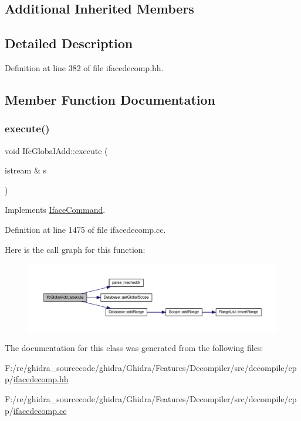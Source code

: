 \subsection*{Additional Inherited Members}


\subsection{Detailed Description}


Definition at line 382 of file ifacedecomp.\+hh.



\subsection{Member Function Documentation}
\mbox{\label{class_ifc_global_add_a727b49481db6ac9ae722fbce15ab595c}} 
\subsubsection{\texorpdfstring{execute()}{execute()}}
{\footnotesize\ttfamily void Ifc\+Global\+Add\+::execute (\begin{DoxyParamCaption}\item[{istream \&}]{s }\end{DoxyParamCaption})\hspace{0.3cm}{\ttfamily [virtual]}}



Implements \mbox{\hyperlink{class_iface_command_af10e29cee2c8e419de6efe9e680ad201}{Iface\+Command}}.



Definition at line 1475 of file ifacedecomp.\+cc.

Here is the call graph for this function\+:
\nopagebreak
\begin{figure}[H]
\begin{center}
\leavevmode
\includegraphics[width=350pt]{class_ifc_global_add_a727b49481db6ac9ae722fbce15ab595c_cgraph}
\end{center}
\end{figure}


The documentation for this class was generated from the following files\+:\begin{DoxyCompactItemize}
\item 
F\+:/re/ghidra\+\_\+sourcecode/ghidra/\+Ghidra/\+Features/\+Decompiler/src/decompile/cpp/\mbox{\hyperlink{ifacedecomp_8hh}{ifacedecomp.\+hh}}\item 
F\+:/re/ghidra\+\_\+sourcecode/ghidra/\+Ghidra/\+Features/\+Decompiler/src/decompile/cpp/\mbox{\hyperlink{ifacedecomp_8cc}{ifacedecomp.\+cc}}\end{DoxyCompactItemize}
